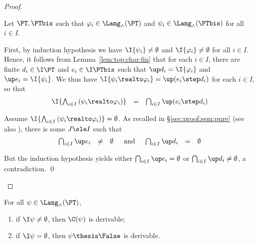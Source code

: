\begin{proof}
\begin{description}
Let $\PT,\PTbis$ such that
$\varphi_i \in \Lang_\land(\PT)$ and $\psi_i \in \Lang_\land(\PTbis)$
for all $i \in I$.

First, by induction hypothesis 
we have
$\I{\psi_i} \neq \emptyset$
and
$\I{\varphi_i} \neq \emptyset$
for all $i \in I$.
Hence, it follows from Lemma~\ref{lem:top:char:fin}
that for each $i \in I$,
there are finite $d_i \in \I\PT$
and $e_i \in \I\PTbis$
such that
$\up d_i = \I{\varphi_i}$
and
$\up e_i = \I{\psi_i}$.
We thus have
$\I{\psi_i \realto \varphi_i} = \up(e_i \step d_i)$
for each $i \in I$,
so that
\[
\begin{array}{l l l}
  \I{\bigwedge_{i \in I} \left( \psi_i \realto \varphi_i \right)}
& =
& \bigcap_{i \in I} \up(e_i \step d_i)
\end{array}
\]


Assume 
$\I{\bigwedge_{i \in I} \left( \psi_i \realto \varphi_i \right)} = \emptyset$.
As recalled in \S\ref{sec:proof:sem:pure}
(see also \cite[Theorem 1.4.12]{ac98book}),
there is some $J \sle I$
such that
\[
\begin{array}{l l l !{\quad\text{and}\quad} l l l}
  \bigcap_{i \in I} \up e_i
& \neq
& \emptyset

& \bigcap_{i \in I} \up d_i
& =
& \emptyset
\end{array}
\]

But the induction hypothesis
yields either $\bigcap_{i \in I} \up e_i = \emptyset$
or $\bigcap_{i \in I} \up d_i \neq \emptyset$,
a contradiction.
\qed
\end{description}
\end{proof}

\begin{lemma}
\label{lem:proof:compl:fin:ded:c-false}
For all $\psi \in \Lang_\land(\PT)$,
\begin{enumerate}[(1)]
\item
\label{item:proof:compl:fin:ded:c-false:c}
if $\I\psi \neq \emptyset$,
then $\C(\psi)$ is derivable;


\item
\label{item:proof:compl:fin:ded:c-false:ded}
if $\I\psi = \emptyset$,
then $\psi \thesis \False$ is derivable.
\end{enumerate}
\end{lemma}

